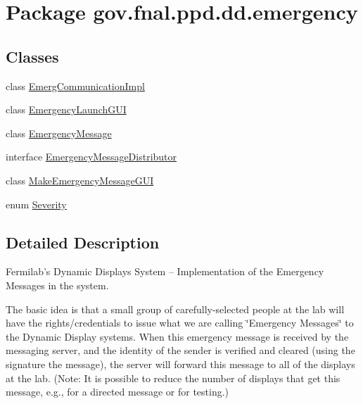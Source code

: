 \hypertarget{namespacegov_1_1fnal_1_1ppd_1_1dd_1_1emergency}{\section{Package gov.\-fnal.\-ppd.\-dd.\-emergency}
\label{namespacegov_1_1fnal_1_1ppd_1_1dd_1_1emergency}
}
\subsection*{Classes}
\begin{DoxyCompactItemize}
\item 
class \hyperlink{classgov_1_1fnal_1_1ppd_1_1dd_1_1emergency_1_1EmergCommunicationImpl}{Emerg\-Communication\-Impl}
\item 
class \hyperlink{classgov_1_1fnal_1_1ppd_1_1dd_1_1emergency_1_1EmergencyLaunchGUI}{Emergency\-Launch\-G\-U\-I}
\item 
class \hyperlink{classgov_1_1fnal_1_1ppd_1_1dd_1_1emergency_1_1EmergencyMessage}{Emergency\-Message}
\item 
interface \hyperlink{interfacegov_1_1fnal_1_1ppd_1_1dd_1_1emergency_1_1EmergencyMessageDistributor}{Emergency\-Message\-Distributor}
\item 
class \hyperlink{classgov_1_1fnal_1_1ppd_1_1dd_1_1emergency_1_1MakeEmergencyMessageGUI}{Make\-Emergency\-Message\-G\-U\-I}
\item 
enum \hyperlink{enumgov_1_1fnal_1_1ppd_1_1dd_1_1emergency_1_1Severity}{Severity}
\end{DoxyCompactItemize}


\subsection{Detailed Description}
Fermilab's Dynamic Displays System -- Implementation of the Emergency Messages in the system. 

The basic idea is that a small group of carefully-\/selected people at the lab will have the rights/credentials to issue what we are calling \char`\"{}\-Emergency Messages\char`\"{} to the Dynamic Display systems. When this emergency message is received by the messaging server, and the identity of the sender is verified and cleared (using the signature the message), the server will forward this message to all of the displays at the lab. (Note\-: It is possible to reduce the number of displays that get this message, e.\-g., for a directed message or for testing.) 

